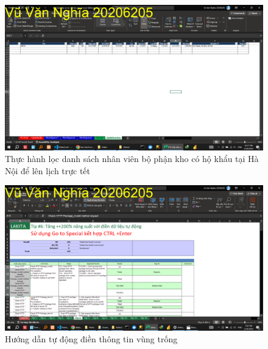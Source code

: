 \documentclass{article}
\begin{document}
\begin{figure}[h]
    \centering
    \includegraphics[scale = 0.15]{Video2/ThucHanh/7.png}
    \caption{Thực hành lọc danh sách nhân viên bộ phận kho có hộ khẩu tại Hà Nội để lên lịch trực tết}
\end{figure}
\begin{figure}[h]
    \centering
    \includegraphics[scale = 0.15]{Video3/HuongDan/1.png}
    \caption{Hướng dẫn tự động điền thông tin vùng trống}
\end{figure}
\end{document}
